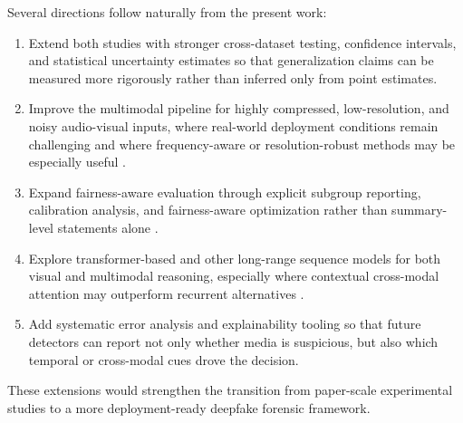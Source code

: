 Several directions follow naturally from the present work:
\begin{enumerate}[label=\arabic*.]
    \item Extend both studies with stronger cross-dataset testing, confidence intervals, and statistical uncertainty estimates so that generalization claims can be measured more rigorously rather than inferred only from point estimates.
    \item Improve the multimodal pipeline for highly compressed, low-resolution, and noisy audio-visual inputs, where real-world deployment conditions remain challenging and where frequency-aware or resolution-robust methods may be especially useful \cite{Kim2024Freq}.
    \item Expand fairness-aware evaluation through explicit subgroup reporting, calibration analysis, and fairness-aware optimization rather than summary-level statements alone \cite{Ju2024Fairness,fu2025unbiased}.
    \item Explore transformer-based and other long-range sequence models for both visual and multimodal reasoning, especially where contextual cross-modal attention may outperform recurrent alternatives \cite{Katamneni2024}.
    \item Add systematic error analysis and explainability tooling so that future detectors can report not only whether media is suspicious, but also which temporal or cross-modal cues drove the decision.
\end{enumerate}

These extensions would strengthen the transition from paper-scale experimental studies to a more deployment-ready deepfake forensic framework.